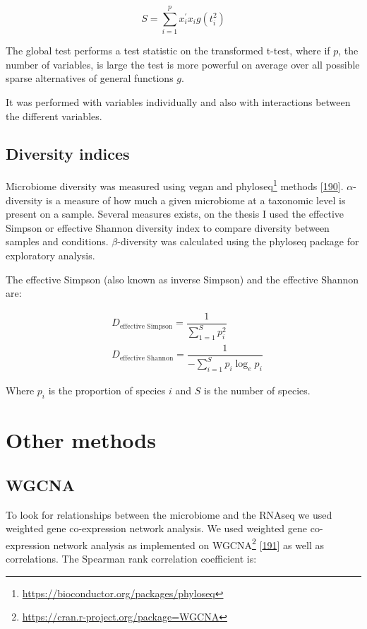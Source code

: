 \documentclass[
  a4paper,
]{book}
\DeclareRobustCommand{\href}[2]{#2\footnote{\url{#1}}}
\begin{document}
\[
S = \sum_{i=1}^p x_i^{'} x_i g(t_i^2)
\]

The global test performs a test statistic on the transformed t-test, where if \(p\), the number of variables, is large the test is more powerful on average over all possible sparse alternatives of general functions \(g\).

It was performed with variables individually and also with interactions between the different variables.

\hypertarget{diversity-indices}{%
\subsection{Diversity indices}\label{diversity-indices}}

Microbiome diversity was measured using vegan and \href{https://bioconductor.org/packages/phyloseq}{phyloseq} methods {[}\protect\hyperlink{ref-oksanen2020}{190}{]}.
\(\alpha\)-diversity is a measure of how much a given microbiome at a taxonomic level is present on a sample.
Several measures exists, on the thesis I used the effective Simpson or effective Shannon diversity index to compare diversity between samples and conditions.
\(\beta\)-diversity was calculated using the phyloseq package for exploratory analysis.

The effective Simpson (also known as inverse Simpson) and the effective Shannon are:

\[
\begin{aligned}
& D_{\text{effective Simpson}} = \dfrac{1}{\sum_{1=1}^Sp_i^2} \\
& D_{\text{effective Shannon}} = \dfrac{1}{-\sum_{i =1}^S p_i \log_e{p_i}}
\end{aligned}
\]

Where \(p_i\) is the proportion of species \(i\) and \(S\) is the number of species.

\hypertarget{other-methods}{%
\section{Other methods}\label{other-methods}}

\hypertarget{wgcna}{%
\subsection{WGCNA}\label{wgcna}}

To look for relationships between the microbiome and the RNAseq we used weighted gene co-expression network analysis.
We used weighted gene co-expression network analysis as implemented on \href{https://cran.r-project.org/package=WGCNA}{WGCNA} {[}\protect\hyperlink{ref-langfelder2008}{191}{]} as well as correlations.
The Spearman rank correlation coefficient is:
\end{document}
